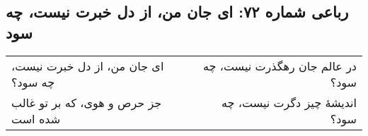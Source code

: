 \begin{center}
\section*{رباعی شماره ۷۲: ای جان من، از دل خبرت نیست، چه سود}
\label{sec:072}
\begin{longtable}{l p{0.5cm} r}
ای جان من، از دل خبرت نیست، چه سود؟
&&
در عالم جان رهگذرت نیست، چه سود؟
\\
جز حرص و هوی، که بر تو غالب شده است
&&
اندیشهٔ چیز دگرت نیست، چه سود؟
\\
\end{longtable}
\end{center}
